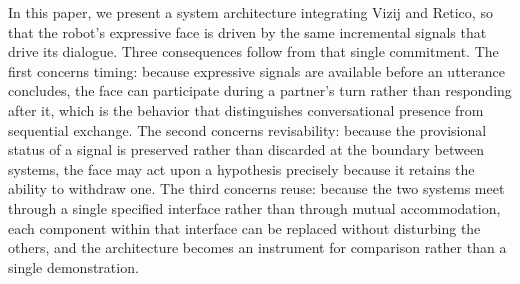 In this paper, we present a system architecture integrating Vizij and Retico, so that the robot's expressive face is driven by the same incremental signals that drive its dialogue. Three consequences follow from that single
commitment. The first concerns timing: because expressive signals are
available before an utterance concludes, the face can participate during a
partner's turn rather than responding after it, which is the behavior that
distinguishes conversational presence from sequential exchange. The second
concerns revisability: because the provisional status of a signal is preserved
rather than discarded at the boundary between systems, the face may act upon a
hypothesis precisely because it retains the ability to withdraw one. The third
concerns reuse: because the two systems meet through a single specified
interface rather than through mutual accommodation, each component within that
interface can be replaced without disturbing the others, and the architecture
becomes an instrument for comparison rather than a single demonstration.

